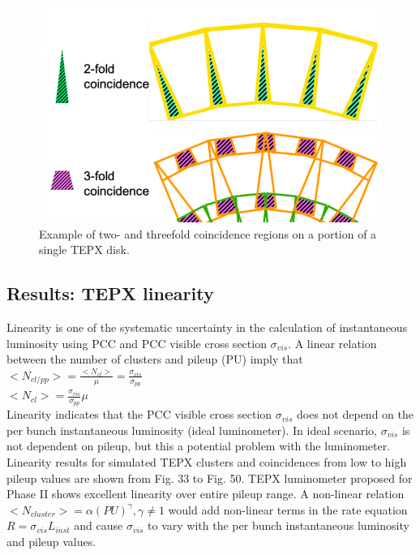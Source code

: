 \begin{figure}[H]
  \centering
  \includegraphics[width=0.6\columnwidth]{./23coin.png}
  \caption{\onehalfspacing Example of two- and threefold coincidence regions on a portion of a single TEPX disk.}
  \label{fig:CMS}
\end{figure}

\subsection{Results: TEPX linearity}

Linearity is one of the systematic uncertainty in the calculation of instantaneous luminosity using PCC and PCC visible cross section $\sigma_{vis}$. A linear relation between the number of clusters and pileup (PU) imply that \\

$<N_{cl/pp}> = \frac{<N_{cl}>}{\mu} = \frac{\sigma_{vis}}{\sigma_{pp}}$ \\

$<N_{cl}> =  \frac{\sigma_{vis}}{\sigma_{pp}} \mu $ \\

Linearity indicates that the PCC visible cross section $\sigma_{vis}$ does not depend on the per bunch instantaneous luminosity (ideal luminometer). In ideal scenario, $\sigma_{vis}$ is not dependent on pileup, but this a potential problem with the luminometer. Linearity results for simulated TEPX clusters and coincidences from low to high pileup values are shown from Fig. 33 to Fig. 50. TEPX luminometer proposed for Phase II shows excellent linearity over entire pileup range. A non-linear relation $<N_{cluster}> = \alpha (PU)^{\gamma}, \gamma \neq 1$ would add non-linear terms in the rate equation $R = \sigma_{vis} L_{inst}$  and cause $\sigma_{vis}$ to vary with the per bunch instantaneous luminosity and pileup values.


